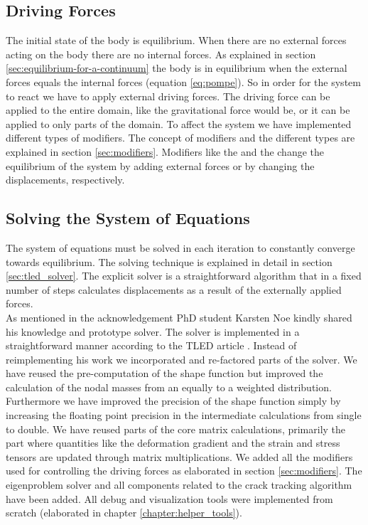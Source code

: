 \subsection*{Driving Forces}
The initial state of the body is equilibrium. When there are no
external forces acting on the body there are no internal forces. As
explained in section \vref{sec:equilibrium-for-a-continuum} the body
is in equilibrium 
when the external forces equals the internal forces (equation
\ref{eq:pompe}). So in order for the system to react we have to apply
external driving forces. The driving force can be applied to the
entire domain, like the gravitational force would be, or it can be
applied to only parts of the domain. To affect the system we have
implemented different types of modifiers. The concept of modifiers and
the different types are explained in section
\vref{sec:modifiers}. Modifiers like the  and the  change the
equilibrium of the system by adding external forces or by changing the
displacements, respectively.

\subsection*{Solving the System of Equations}
The system of equations must be solved in each iteration to constantly
converge towards equilibrium. The solving technique is explained in detail
in section \vref{sec:tled_solver}. The explicit solver
is a straightforward algorithm that in a fixed
number of steps calculates displacements as a result of the externally
applied forces. \\
%

As mentioned in the acknowledgement PhD student Karsten Noe
kindly shared his knowledge and prototype solver. The solver is
implemented in a straightforward manner according to the 
TLED article . Instead of reimplementing his work
we incorporated and re-factored parts of the solver. We have
reused the pre-computation of the shape function but improved the
calculation of the nodal masses from an equally to a weighted
distribution. Furthermore we have improved the precision of the shape
function simply by increasing the floating point precision in the
intermediate calculations from single to double. We have reused parts
of the core matrix
calculations, primarily the part where quantities like the
deformation gradient and the strain and stress tensors are updated
through matrix multiplications. 
We added all the modifiers used for
controlling the driving forces as elaborated in section
\vref{sec:modifiers}. The eigenproblem solver and all components
related to the crack tracking algorithm have been added. All debug and
visualization tools were implemented from scratch (elaborated in
chapter \vref{chapter:helper_tools}). 


